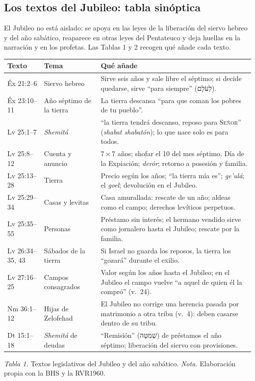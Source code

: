 \documentclass[11pt,letterpaper]{article}
\newcommand{\heb}[1]{\mbox{\foreignlanguage{hebrew}{#1}}}
\newcommand{\SENOR}{\textsc{Señor}}
\newcommand{\pie}[1]{\par{\footnotesize\color{sepia}#1\par}}
\begin{document}
\subsection{Los textos del Jubileo: tabla sinóptica}
El Jubileo no está aislado: se apoya en las leyes de la liberación del siervo hebreo y del año sabático, reaparece en otras leyes del Pentateuco y deja huellas en la narración y en los profetas. Las Tablas 1 y 2 recogen qué añade cada texto.

\begin{center}\begin{minipage}{\linewidth}\centering\small\renewcommand{\arraystretch}{1.18}
\begin{tabular}{@{}L{2.4cm}L{4.6cm}L{7.6cm}@{}}
\toprule
\textbf{Texto} & \textbf{Tema} & \textbf{Qué añade} \\ \midrule
Éx 21:2--6 & Siervo hebreo & Sirve seis años y sale libre el séptimo; si decide quedarse, sirve ``para siempre'' (\heb{לְעֹלָם}). \\
Éx 23:10--11 & Año séptimo de la tierra & La tierra descansa ``para que coman los pobres de tu pueblo''. \\
Lv 25:1--7 & \emph{Shemitá} & ``la tierra tendrá descanso, reposo para \SENOR'' (\emph{shabat shabatón}); lo que nace solo es para todos. \\
Lv 25:8--12 & Cuenta y anuncio & 7\,×\,7 años; shofar el 10 del mes séptimo, Día de la Expiación; \emph{derór}; retorno a posesión y familia. \\
Lv 25:13--28 & Tierra & Precio según los años; ``la tierra mía es''; \emph{ge'ulá}; el \emph{goel}; devolución en el Jubileo. \\
Lv 25:29--34 & Casas y levitas & Casa amurallada: rescate de un año; aldeas como el campo; derechos levíticos perpetuos. \\
Lv 25:35--55 & Personas & Préstamo sin interés; el hermano vendido sirve como jornalero hasta el Jubileo; rescate por la familia. \\
Lv 26:34--35, 43 & Sábados de la tierra & Si Israel no guarda los reposos, la tierra los ``gozará'' durante el exilio. \\
Lv 27:16--25 & Campos consagrados & Valor según los años hasta el Jubileo; en el Jubileo el campo vuelve ``a aquel de quien él la compró'' (v.~24). \\
Nm 36:1--12 & Hijas de Zelofehad & El Jubileo no corrige una herencia pasada por matrimonio a otra tribu (v.~4): deben casarse dentro de su tribu. \\
Dt 15:1--18 & \emph{Shemitá} de deudas & ``Remisión'' (\heb{שְׁמִטָּה}) de préstamos el año séptimo; liberación del siervo con provisiones. \\
\bottomrule
\end{tabular}\par
\pie{\textit{Tabla 1.} Textos legislativos del Jubileo y del año sabático. \textit{Nota.} Elaboración propia con la BHS y la RVR1960.}
\end{minipage}\end{center}
\end{document}
